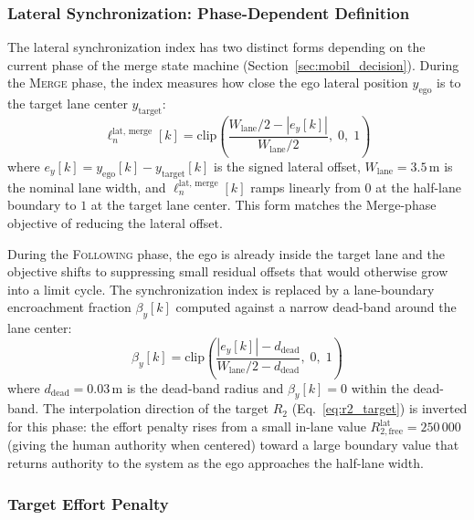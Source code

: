 \documentclass[12pt,a4paper,oneside]{report}
\begin{document}
\subsubsection{Lateral Synchronization: Phase-Dependent Definition}

The lateral synchronization index has two distinct forms depending on the current phase of the merge state machine (Section~\ref{sec:mobil_decision}). During the \textsc{Merge} phase, the index measures how close the ego lateral position $y_{\text{ego}}$ is to the target lane center $y_{\text{target}}$:
\begin{equation}
\ell_n^{\text{lat, merge}}[k] = \mathrm{clip}\!\left( \frac{W_{\text{lane}}/2 - |e_y[k]|}{W_{\text{lane}}/2}, \; 0, \; 1 \right)
\label{eq:ln_lat_merge}
\end{equation}
where $e_y[k] = y_{\text{ego}}[k] - y_{\text{target}}[k]$ is the signed lateral offset, $W_{\text{lane}} = 3.5\,\mathrm{m}$ is the nominal lane width, and $\ell_n^{\text{lat, merge}}[k]$ ramps linearly from $0$ at the half-lane boundary to $1$ at the target lane center. This form matches the Merge-phase objective of reducing the lateral offset.

During the \textsc{Following} phase, the ego is already inside the target lane and the objective shifts to suppressing small residual offsets that would otherwise grow into a limit cycle. The synchronization index is replaced by a lane-boundary encroachment fraction $\beta_y[k]$ computed against a narrow dead-band around the lane center:
\begin{equation}
\beta_y[k] = \mathrm{clip}\!\left( \frac{|e_y[k]| - d_{\text{dead}}}{W_{\text{lane}}/2 - d_{\text{dead}}}, \; 0, \; 1 \right)
\label{eq:beta_y_following}
\end{equation}
where $d_{\text{dead}} = 0.03\,\mathrm{m}$ is the dead-band radius and $\beta_y[k] = 0$ within the dead-band. The interpolation direction of the target $R_2$ (Eq.~\eqref{eq:r2_target}) is inverted for this phase: the effort penalty rises from a small in-lane value $R_{2,\text{free}}^{\text{lat}} = 250\,000$ (giving the human authority when centered) toward a large boundary value that returns authority to the system as the ego approaches the half-lane width.

\subsubsection{Target Effort Penalty}
\end{document}
